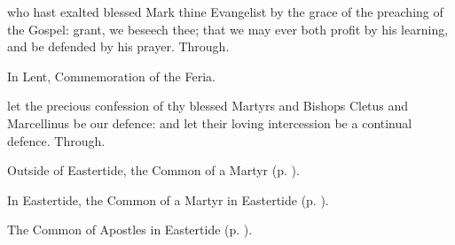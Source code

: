 {} who hast exalted blessed Mark thine Evangelist by the grace of the preaching of the Gospel: grant, we beseech thee; that we may ever both profit by his learning, and be defended by his prayer. Through.
\begin{rubric}
    In Lent, Commemoration of the Feria.%
\end{rubric}


\clearpage
{}

%

\memorialCollect
{} let the precious confession of thy blessed Martyrs and Bishops Cletus and Marcellinus be our defence: and let their loving intercession be a continual defence. Through.




\begin{rubric}
	Outside of Eastertide, the Common of a Martyr (p. \pageref{CommonMartyrNotBishopCollect}).
\end{rubric}

\begin{rubric}
	In Eastertide, the Common of a Martyr in Eastertide (p. \pageref{CommonMartyrNotBishopEasterCollect}).
\end{rubric}



\begin{rubric}
	The Common of Apostles in Eastertide (p. \pageref{CommonApostlesEaster}).
\end{rubric}


\vspace{-1\baselineskip}

